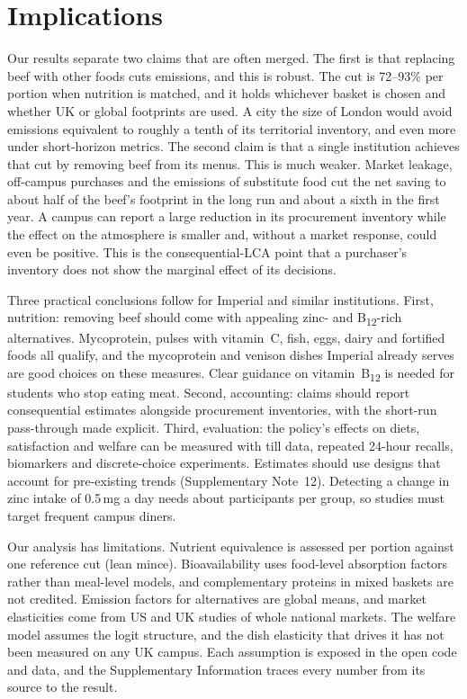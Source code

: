 \documentclass[10pt]{article}
\begin{document}
\section{Implications}

Our results separate two claims that are often merged. The first is that replacing beef with
other foods cuts emissions, and this is robust. The cut is 72--93\% per portion when nutrition is
matched, and it holds whichever basket is chosen and whether UK or global footprints are used. A
city the size of London would avoid emissions equivalent to roughly a tenth of its territorial
inventory, and even more under short-horizon metrics. The second claim is that a single institution
achieves that cut by removing beef from its menus. This is much weaker. Market leakage, off-campus
purchases and the emissions of substitute food cut the net saving to about half of the beef's
footprint in the long run and about a sixth in the first year. A campus can report a large reduction in its procurement inventory while
the effect on the atmosphere is smaller and, without a market response, could even be positive.
This is the consequential-LCA point that a purchaser's inventory does not show the marginal effect
of its decisions\cite{ekvall2004,budolfson2019}.

Three practical conclusions follow for Imperial and similar institutions. First, nutrition: removing
beef should come with appealing zinc- and B\textsubscript{12}-rich alternatives. Mycoprotein, pulses with
vitamin~C, fish, eggs, dairy and fortified foods all qualify, and the mycoprotein and venison dishes
Imperial already serves are good choices on these measures. Clear guidance on vitamin~B\textsubscript{12}
is needed for students who stop eating meat. Second, accounting: claims should report consequential
estimates alongside procurement inventories, with the short-run pass-through made explicit. Third,
evaluation: the policy's effects on diets, satisfaction and welfare can be measured with till data,
repeated 24-hour recalls\cite{bradley2016}, biomarkers and discrete-choice experiments\cite{johnston2017}.
Estimates should use designs that account for pre-existing trends\cite{callaway2021,abadie2010,hausman2018}
(Supplementary Note~12). Detecting a change in zinc intake of 0.5\,mg a day needs about \PowerN{}
participants per group, so studies must target frequent campus diners.

Our analysis has limitations. Nutrient equivalence is assessed per portion against one reference
cut (lean mince). Bioavailability uses food-level absorption factors rather than meal-level models,
and complementary proteins in mixed baskets are not credited. Emission factors for alternatives are
global means, and market elasticities come from US and UK studies of whole national markets. The
welfare model assumes the logit structure, and the dish elasticity that drives it has not been
measured on any UK campus. Each assumption is exposed in the open code and data, and the
Supplementary Information traces every number from its source to the result.
\end{document}
